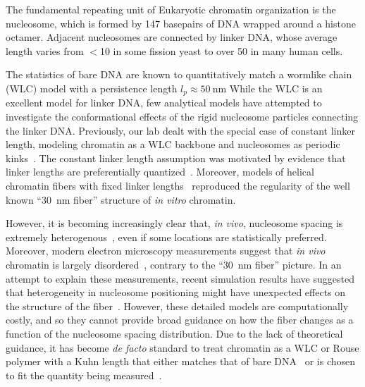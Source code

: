 \documentclass[%
 reprint,
superscriptaddress,
showpacs,preprintnumbers,
 amsmath,amssymb,
 aps,
 prl,
]{revtex4-1}
\begin{document}
The fundamental repeating unit of Eukaryotic chromatin organization is the
    nucleosome, which is formed by 147 basepairs of DNA wrapped around a histone octamer.
Adjacent nucleosomes are connected by linker DNA, whose average length varies from
    $<$\SI{10}{\basepair} in some fission yeast\cite{TODO} to over \SI{50}{\basepair} in
    many human cells\cite{TODO}.

The statistics of bare DNA are known to quantitatively match a wormlike
    chain (WLC) model with a persistence length {$l_p \approx
    \SI{50}{\nano\metre}$}
While the WLC is an excellent model for linker DNA, few analytical models have
    attempted to investigate the conformational effects of the rigid nucleosome
    particles connecting the linker DNA\@.
Previously, our lab dealt with the special case of constant linker length,
    modeling chromatin as a WLC backbone and nucleosomes as periodic
    kinks~\cite{koslover2013}.
The constant linker length assumption was motivated by evidence
    that linker lengths are preferentially
    quantized~\cite{widom92,chereji18,add-more}.
Moreover, models of helical chromatin fibers with fixed linker
    lengths~\cite{grigoryev-but-which-one}
    reproduced the regularity of the well known ``\SI{30}{\nano\metre}
    fiber'' structure of \textit{in vitro} chromatin.

However, it is becoming increasingly clear that, \textit{in vivo}, nucleosome
    spacing is extremely
    heterogenous~\cite{nat-chem-meth-paper-on-mnase,chereji,at-least-one-eukaryotic-alignment/phasing-paper},
    even if some locations are statistically preferred.
Moreover, modern electron microscopy measurements suggest that \textit{in vivo}
    chromatin is largely disordered~\cite{ou2017}, contrary to the
    ``\SI{30}{\nano\metre} fiber'' picture.
In an attempt to explain these measurements, recent simulation results have
    suggested that heterogeneity in nucleosome positioning might have unexpected
    effects on the structure of the
    fiber~\cite{collepardo-guevardo2011,other-tamar-papers}.
However, these detailed models are computationally costly, and so they cannot
    provide broad guidance on how the fiber changes as a function of the nucleosome
    spacing distribution.
Due to the lack of theoretical guidance, it has become \textit{de facto}
    standard to treat chromatin as a WLC or Rouse polymer with a Kuhn length
    that either matches that of bare
    DNA~\cite{macpherson2018,nuebler2018,11marksfitpaper} or is chosen to fit
    the quantity being measured~\cite{askquinnforexamples}.
\end{document}
